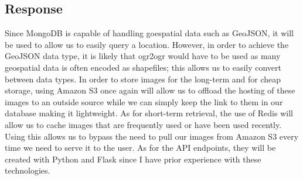\documentclass[11pt]{article}
\begin{document}
	\subsection*{Response}
	Since MongoDB is capable of handling goespatial data such as GeoJSON, it will be used to allow us to easily query a location. However, in order to achieve the GeoJSON data type, it is likely that ogr2ogr would have to be used as many geospatial data is often encoded as shapefiles; this allows us to easily convert between data types. In order to store images for the long-term and for cheap storage, using Amazon S3 once again will allow us to offload the hosting of these images to an outside source while we can simply keep the link to them in our database making it lightweight. As for short-term retrieval, the use of Redis will allow us to cache images that are frequently used or have been used recently. Using this allows us to bypass the need to pull our images from Amazon S3 every time we need to serve it to the user. As for the API endpoints, they will be created with Python and Flask since I have prior experience with these technologies. 
\end{document}
